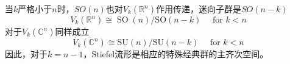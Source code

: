 \documentclass{article}
\numberwithin{equation}{subsection}
\begin{document}
当$k$严格小于$n$时，$SO(n)$也对$V_k(\mathbb{R}^n)$作用传递，迷向子群是$SO(n-k)$
\begin{equation}
    V_{k}\left(\mathbb{R}^{n}\right) \cong \operatorname{SO}(n) / \mathrm{SO}(n-k) \quad \text { for } k<n
\end{equation}
对于$V_k(\mathbb{C}^n)$同样成立
\begin{equation}
    V_{k}\left(\mathbb{C}^{n}\right) \cong \mathrm{SU}(n) / \mathrm{SU}(n-k) \quad \text { for } k<n
\end{equation}
因此，对于$k = n−1$，Stiefel流形是相应的特殊经典群的主齐次空间。
\end{document}
